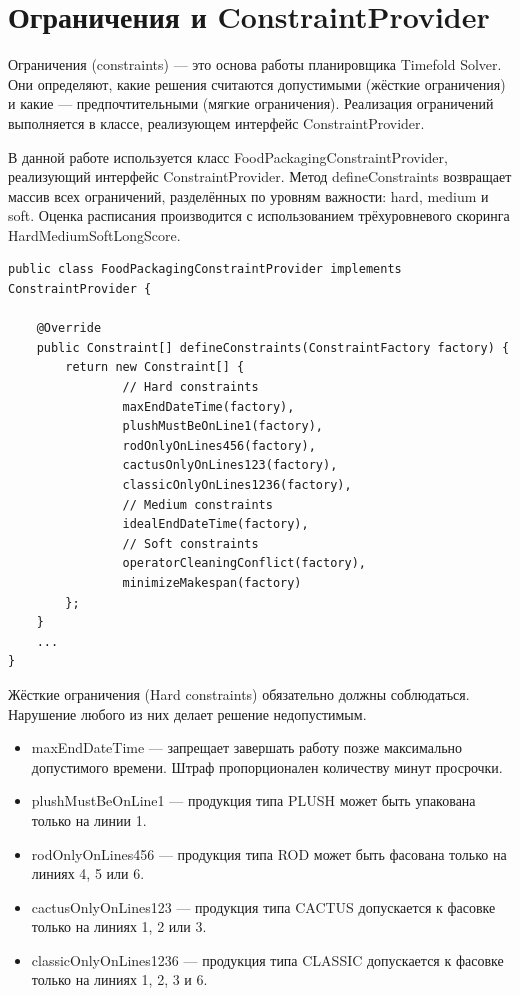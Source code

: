 \section{Ограничения и ConstraintProvider}

Ограничения (constraints) — это основа работы планировщика Timefold Solver. Они определяют, какие решения считаются допустимыми (жёсткие ограничения) и какие — предпочтительными (мягкие ограничения). Реализация ограничений выполняется в классе, реализующем интерфейс ConstraintProvider.

В данной работе используется класс FoodPackagingConstraintProvider, реализующий интерфейс ConstraintProvider. Метод defineConstraints возвращает массив всех ограничений, разделённых по уровням важности: hard, medium и soft. Оценка расписания производится с использованием трёхуровневого скоринга HardMediumSoftLongScore.

\vspace{5cm}

\begin{lstlisting}[caption={класс FoodPackagingConstraintProvider}, label={lst:classConstraintProvider}]
public class FoodPackagingConstraintProvider implements ConstraintProvider {

    @Override
    public Constraint[] defineConstraints(ConstraintFactory factory) {
        return new Constraint[] {
                // Hard constraints
                maxEndDateTime(factory),
                plushMustBeOnLine1(factory),
                rodOnlyOnLines456(factory),
                cactusOnlyOnLines123(factory),
                classicOnlyOnLines1236(factory),
                // Medium constraints
                idealEndDateTime(factory),
                // Soft constraints
                operatorCleaningConflict(factory),
                minimizeMakespan(factory)
        };
    }
    ...
}
\end{lstlisting}

Жёсткие ограничения (Hard constraints) обязательно должны соблюдаться. Нарушение любого из них делает решение недопустимым.

\begin{itemize}
    \item maxEndDateTime — запрещает завершать работу позже максимально допустимого времени. Штраф пропорционален количеству минут просрочки.
    \item plushMustBeOnLine1 — продукция типа PLUSH может быть упакована только на линии 1.
    \item rodOnlyOnLines456 — продукция типа ROD может быть фасована только на линиях 4, 5 или 6.
    \item cactusOnlyOnLines123 — продукция типа CACTUS допускается к фасовке только на линиях 1, 2 или 3.
    \item classicOnlyOnLines1236 — продукция типа CLASSIC допускается к фасовке только на линиях 1, 2, 3 и 6.
\end{itemize}

